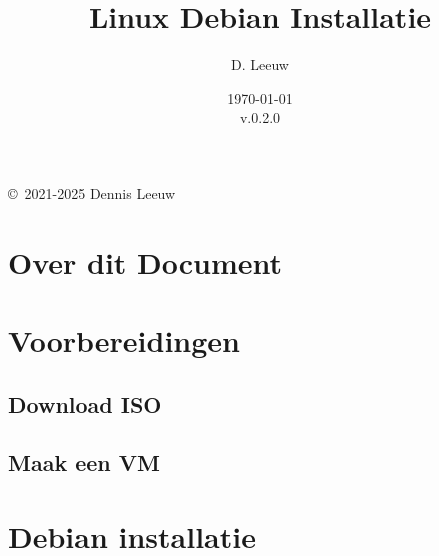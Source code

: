 \documentclass[a4paper,12pt,twoside,openright,titlepage]{book}
\author{D. Leeuw}
\title{Linux Debian Installatie}
\date{\today\\v.0.2.0}
\begin{document}

\maketitle

\copyright\ 2021-2025 Dennis Leeuw\\




\frontmatter
\chapter{Over dit Document}
%
%

\tableofcontents

\mainmatter

\chapter{Voorbereidingen}
\section{Download ISO}

\section{Maak een VM}


\chapter{Debian installatie}


\printindex
\end{document}
